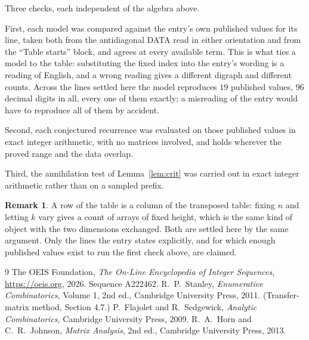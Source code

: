 \documentclass[11pt,a4paper]{article}
\theoremstyle{plain}
\theoremstyle{definition}
\newtheorem{remark}[theorem]{Remark}
\begin{document}
Three checks, each independent of the algebra above.

First, each model was compared against the entry's own published values for its line, taken
both from the antidiagonal DATA read in either orientation and from the ``Table starts''
block, and agrees at every available term. This is what ties a model to the table:
substituting the fixed index into the entry's wording is a reading of English, and a wrong
reading gives a different digraph and different counts. Across the lines settled here the
model reproduces $19$ published values, $96$ decimal digits in all, every one of
them exactly; a misreading of the entry would have to reproduce all of them by accident.

Second, each conjectured recurrence was evaluated on those published values in exact
integer arithmetic, with no matrices involved, and holds wherever the proved range and the
data overlap.

Third, the annihilation test of Lemma~\ref{lem:crit} was carried out in exact integer
arithmetic rather than on a sampled prefix.

\begin{remark}
A row of the table is a column of the transposed table: fixing $n$ and letting $k$ vary gives a
count of arrays of fixed height, which is the same kind of object with the two dimensions
exchanged. Both are settled here by the same argument. Only the lines the entry states
explicitly, and for which enough published values exist to run the first check above, are
claimed.
\end{remark}

\begin{thebibliography}{9}
 The OEIS Foundation, \emph{The On-Line Encyclopedia of Integer
Sequences}, \url{https://oeis.org}, 2026. Sequence A222462.
 R.~P.~Stanley, \emph{Enumerative Combinatorics}, Volume 1, 2nd ed.,
Cambridge University Press, 2011. (Transfer-matrix method, Section 4.7.)
 P.~Flajolet and R.~Sedgewick, \emph{Analytic Combinatorics}, Cambridge
University Press, 2009.
 R.~A.~Horn and C.~R.~Johnson, \emph{Matrix Analysis}, 2nd ed., Cambridge
University Press, 2013.
\end{thebibliography}
\end{document}
